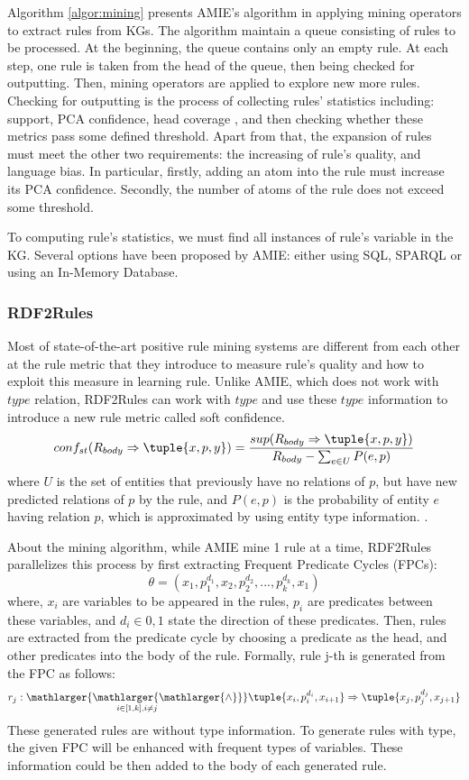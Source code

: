 Algorithm \ref{algor:mining} presents AMIE's algorithm in applying mining operators to extract rules from KGs. The algorithm maintain a queue consisting of rules to be processed. At the beginning, the queue contains only an empty rule. At each step, one rule is taken from the head of the queue, then being checked for outputting. Then, mining operators are applied to explore new more rules.
Checking for outputting is the process of collecting rules' statistics including: support, PCA confidence, head coverage \cite{}, and then checking whether these metrics pass some defined threshold. Apart from that, the expansion of rules must meet the other two requirements: the increasing of rule's quality, and language bias. In particular, firstly, adding an atom into the rule must increase its PCA confidence. Secondly, the number of atoms of the rule does not exceed some threshold.

To computing rule's statistics, we must find all instances of rule's variable in the KG. Several options have been proposed by AMIE: either using SQL, SPARQL \cite{} or using an In-Memory Database.

\subsubsection{RDF2Rules}
Most of state-of-the-art positive rule mining systems are different from each other at the rule metric that they introduce to measure rule's quality and how to exploit this measure in learning rule.
Unlike AMIE, which does not work with $type$ relation, RDF2Rules \cite{} can work with $type$ and use these $type$ information to  introduce a new rule metric called soft confidence.
\[conf_{st}(R_{body} \Rightarrow \tuple{x,p,y}) = \frac{sup(R_{body} \Rightarrow \tuple{x,p,y})}{R_{body} - \sum_{e \in U}P(e,p)} \]
where $U$ is the set of entities that previously have no relations of $p$, but have new predicted relations of $p$ by the rule, and $P(e,p)$ is the probability of entity $e$ having relation $p$, which is approximated by using entity type information. \cite{}.

About the mining algorithm, while AMIE mine 1 rule at a time, RDF2Rules parallelizes this process by first extracting Frequent Predicate Cycles (FPCs):
\[\theta = (x_1, p_1^{d_1}, x_2, p_2^{d_2}, ..., p_k^{d_k}, x_1)\]
where, ${x_i}$ are variables to be appeared in the rules, ${p_i}$ are predicates between these variables, and ${d_i \in {0,1}}$ state the direction of these predicates. Then, rules are extracted from the predicate cycle by choosing a predicate as the head, and other predicates into the body of the rule. Formally, rule j-th is generated from the FPC as follows:
\[r_j: \underset{i \in [1,k], i \ne j}{\mathlarger{\mathlarger{\mathlarger{\wedge}}}} \tuple{x_i,p_i^{d_i},x_{i+1}} \Rightarrow \tuple{x_j,p_j^{d_j},x_{j+1}}\]
These generated rules are without type information. To generate rules with type, the given FPC will be enhanced with frequent types of variables. These information could be then added to the body of each generated rule.

